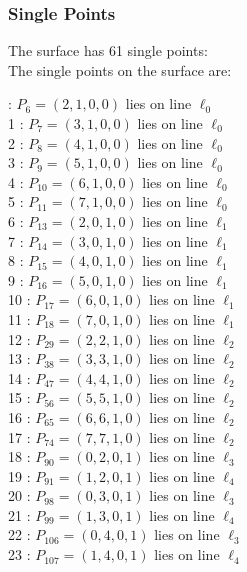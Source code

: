 \documentclass{article}
\begin{document}
{\subsubsection*{Single Points}
The surface has 61 single points:\\
The single points on the surface are:\\
\begin{multicols}{2}
 : $P_{6}=( 2, 1, 0, 0 )$ lies on line $\ell_{0}$\\
1 : $P_{7}=( 3, 1, 0, 0 )$ lies on line $\ell_{0}$\\
2 : $P_{8}=( 4, 1, 0, 0 )$ lies on line $\ell_{0}$\\
3 : $P_{9}=( 5, 1, 0, 0 )$ lies on line $\ell_{0}$\\
4 : $P_{10}=( 6, 1, 0, 0 )$ lies on line $\ell_{0}$\\
5 : $P_{11}=( 7, 1, 0, 0 )$ lies on line $\ell_{0}$\\
6 : $P_{13}=( 2, 0, 1, 0 )$ lies on line $\ell_{1}$\\
7 : $P_{14}=( 3, 0, 1, 0 )$ lies on line $\ell_{1}$\\
8 : $P_{15}=( 4, 0, 1, 0 )$ lies on line $\ell_{1}$\\
9 : $P_{16}=( 5, 0, 1, 0 )$ lies on line $\ell_{1}$\\
10 : $P_{17}=( 6, 0, 1, 0 )$ lies on line $\ell_{1}$\\
11 : $P_{18}=( 7, 0, 1, 0 )$ lies on line $\ell_{1}$\\
12 : $P_{29}=( 2, 2, 1, 0 )$ lies on line $\ell_{2}$\\
13 : $P_{38}=( 3, 3, 1, 0 )$ lies on line $\ell_{2}$\\
14 : $P_{47}=( 4, 4, 1, 0 )$ lies on line $\ell_{2}$\\
15 : $P_{56}=( 5, 5, 1, 0 )$ lies on line $\ell_{2}$\\
16 : $P_{65}=( 6, 6, 1, 0 )$ lies on line $\ell_{2}$\\
17 : $P_{74}=( 7, 7, 1, 0 )$ lies on line $\ell_{2}$\\
18 : $P_{90}=( 0, 2, 0, 1 )$ lies on line $\ell_{3}$\\
19 : $P_{91}=( 1, 2, 0, 1 )$ lies on line $\ell_{4}$\\
20 : $P_{98}=( 0, 3, 0, 1 )$ lies on line $\ell_{3}$\\
21 : $P_{99}=( 1, 3, 0, 1 )$ lies on line $\ell_{4}$\\
22 : $P_{106}=( 0, 4, 0, 1 )$ lies on line $\ell_{3}$\\
23 : $P_{107}=( 1, 4, 0, 1 )$ lies on line $\ell_{4}$\\

\end{multicols}}
\end{document}
